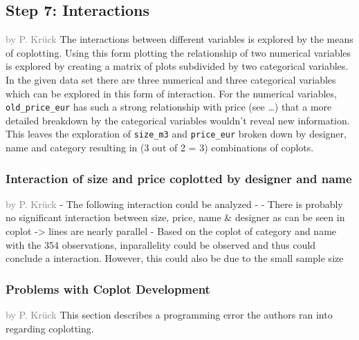 \documentclass[a4paper, nobind]{templates/ociamthesis}
\begin{document}
\hypertarget{step-7-interactions}{%
\subsection{Step 7: Interactions}\label{step-7-interactions}}

\textcolor{gray}{by P. Krück}
The interactions between different variables is explored by the means of coplotting.
Using this form plotting the relationship of two numerical variables is explored by creating a matrix of plots subdivided by two categorical variables.
In the given data set there are three numerical and three categorical variables which can be explored in this form of interaction. For the numerical variables, \texttt{old\_price\_eur} has such a strong relationship with price (see \ldots{}) that a more detailed breakdown by the categorical variables wouldn't reveal new information. This leaves the exploration of \texttt{size\_m3} and \texttt{price\_eur} broken down by designer, name and category resulting in (3 out of 2 = 3) combinations of coplots.

\hypertarget{interaction-of-size-and-price-coplotted-by-designer-and-name}{%
\subsubsection{Interaction of size and price coplotted by designer and name}\label{interaction-of-size-and-price-coplotted-by-designer-and-name}}

\textcolor{gray}{by P. Krück}
- The following interaction could be analyzed
- - There is probably no significant interaction between size, price, name \& designer as can be seen in coplot -\textgreater{} lines are nearly parallel
- Based on the coplot of category and name with the 354 observations, inparallelity could be observed and thus could conclude a interaction. However, this could also be due to the small sample size

\hypertarget{problems-with-coplot-development}{%
\subsubsection{Problems with Coplot Development}\label{problems-with-coplot-development}}

\textcolor{gray}{by P. Krück}
This section describes a programming error the authors ran into regarding coplotting.
\end{document}
